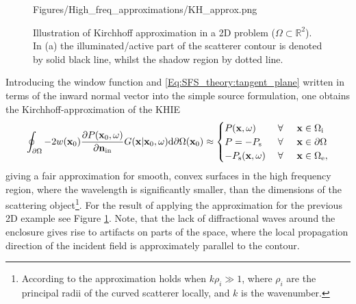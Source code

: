 \begin{figure}
	\centering
	\begin{overpic}[width = 1\columnwidth]{Figures/High_freq_approximations/KH_approx.png}
	\end{overpic}
\caption{Illustration of Kirchhoff approximation in a 2D problem ($\Omega \subset \mathbb{R}^2$). In (a) the illuminated/active part of the scatterer contour is denoted by solid black line, whilst the shadow region by dotted line.}
	\label{Fig:Theory:KH_approximation}
\end{figure}
%
Introducing the window function and \eqref{Eq:SFS_theory:tangent_plane} written in terms of the inward normal vector into the simple source formulation, one obtains the Kirchhoff-approximation of the KHIE
\begin{equation}
\oint_{\partial \Omega} 
- 2w(\mathbf{x}_0)\frac{\partial P(\mathbf{x}_0,\omega)}{\partial \mathbf{n}_{\mathrm{in}}} 
G(\mathbf{x}|\mathbf{x}_0,\omega) 
\mathrm{d} \partial \Omega ( \mathbf{x}_0)
\approx
\begin{cases} 
P(\mathbf{x},\omega)     & \hspace{1mm} \forall \hspace{5mm}   \mathbf{x} \in \Omega_{\mathrm{i}} \\
P=-P_{\mathrm{s}}  & \hspace{1mm} \forall \hspace{5mm}         \mathbf{x} \in \partial \Omega  \\
-P_{\mathrm{s}}(\mathbf{x},\omega)    & \hspace{1mm} \forall \hspace{5mm}  \mathbf{x} \in \Omega_{\mathrm{e}},
\end{cases}
\label{Eq:SFS_theory:Kirchhoff_appr}
\end{equation}
giving a fair approximation for smooth, convex surfaces in the high frequency region, where the wavelength is significantly smaller, than the dimensions of the scattering object\footnote{According to \cite[Eq.(2.7.12)]{Blenstein1975} the approximation holds when $k\rho_i \gg 1$, where $\rho_i$ are the principal radii of the curved scatterer locally, and $k$ is the wavenumber.}. For the result of applying the approximation for the previous 2D example see Figure \ref{Fig:Theory:KH_approximation}. Note, that the lack of diffractional waves around the enclosure gives rise to artifacts on parts of the space, where the local propagation direction of the incident field is approximately parallel to the contour.

